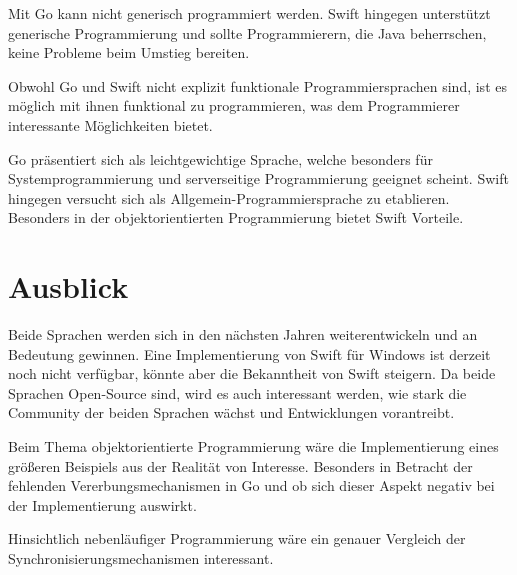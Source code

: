 Mit Go kann nicht generisch programmiert werden.
Swift hingegen unterstützt generische Programmierung und sollte Programmierern, die Java beherrschen, keine Probleme beim Umstieg bereiten.

Obwohl Go und Swift nicht explizit funktionale Programmiersprachen sind, ist es möglich mit ihnen funktional zu programmieren, was dem Programmierer interessante Möglichkeiten bietet.

Go präsentiert sich als leichtgewichtige Sprache, welche besonders für Systemprogrammierung und serverseitige Programmierung geeignet scheint.
Swift hingegen versucht sich als Allgemein-Programmiersprache zu etablieren.
Besonders in der objektorientierten Programmierung bietet Swift Vorteile.

\chapter{Ausblick}
Beide Sprachen werden sich in den nächsten Jahren weiterentwickeln und an Bedeutung gewinnen. 
Eine Implementierung von Swift für Windows ist derzeit noch nicht verfügbar, könnte aber die Bekanntheit von Swift steigern.
Da beide Sprachen Open-Source sind, wird es auch interessant werden, wie stark die Community der beiden Sprachen wächst und Entwicklungen vorantreibt.

Beim Thema objektorientierte Programmierung wäre die Implementierung eines größeren Beispiels aus der Realität von Interesse.
Besonders in Betracht der fehlenden Vererbungsmechanismen in Go und ob sich dieser Aspekt negativ bei der Implementierung auswirkt.

Hinsichtlich nebenläufiger Programmierung wäre ein genauer Vergleich der Synchronisierungsmechanismen interessant.